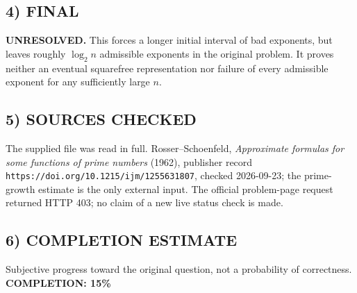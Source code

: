 \subsection*{4) FINAL}
\textbf{UNRESOLVED.} This forces a longer initial interval of bad exponents, but leaves roughly $\log_2 n$ admissible exponents in the original problem. It proves neither an eventual squarefree representation nor failure of every admissible exponent for any sufficiently large $n$.
\subsection*{5) SOURCES CHECKED}
The supplied file was read in full. Rosser--Schoenfeld, \emph{Approximate formulas for some functions of prime numbers} (1962), publisher record \texttt{https://doi.org/10.1215/ijm/1255631807}, checked 2026-09-23; the prime-growth estimate is the only external input. The official problem-page request returned HTTP 403; no claim of a new live status check is made.
\subsection*{6) COMPLETION ESTIMATE}
Subjective progress toward the original question, not a probability of correctness.
\textbf{COMPLETION: 15\%}

